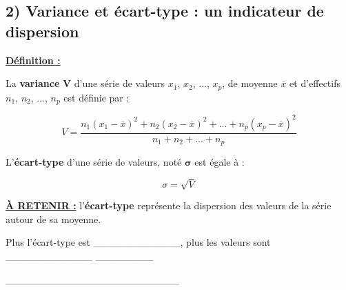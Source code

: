 \documentclass[12pt]{article}
\begin{document}
\vspace{5pt}
\subsection*{\hspace{1cm} 2) Variance et écart-type : un indicateur de dispersion}
\vspace{5pt}

\begin{mdframed}[
    linewidth=1pt,
    roundcorner=5pt,
    linecolor=ForestGreen,
    innertopmargin=10pt,
    innerbottommargin=10pt
]
{\color{ForestGreen}
\textbf{\underline{Définition :}}}

\vspace{5pt}
\textbullet \hspace{0.1cm}La \textbf{variance} $\bm{V}$ d'une série de valeurs $x_1$, $x_2$, ..., $x_p$, de moyenne $\overline{x}$ et 
d'effectifs $n_1$, $n_2$, ..., $n_p$ est définie par :

\[
V = \dfrac{n_1(x_1 - \overline{x})^2 + n_2(x_2 - \overline{x})^2
+ ... + n_p(x_p - \overline{x})^2}{n_1 + n_2 + ... + n_p}
\]

\vspace{10pt}
\textbullet \hspace{0.1cm}L'\textbf{écart-type} d'une série de valeurs, noté $\bm{\sigma}$ est égale à :

\vspace{-5pt}
\[
\sigma = \sqrt{V}
\]

\end{mdframed}

{\color{red}\textbf{\underline{À RETENIR :}}} l'\textbf{écart-type} représente la dispersion 
des valeurs de la série autour de sa moyenne.

\vspace{15pt}
Plus l'écart-type est \_\_\_\_\_\_\_\_\_\_\_\_, plus les valeurs sont \_\_\_\_\_\_\_\_\_\_\_\_
\_\_\_\_\_\_\_\_

\vspace{15pt}
\_\_\_\_\_\_\_\_\_\_\_\_\_\_\_\_\_\_\_\_\_\_\_\_
\end{document}

